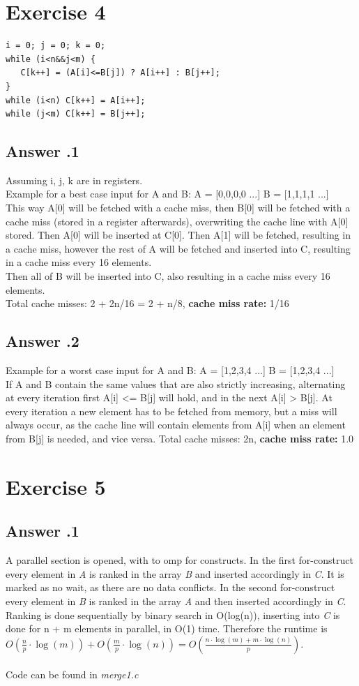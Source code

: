 \documentclass[a4paper,%
11pt,%
DIV=12,
headsepline,%
headings=normal,
]{scrartcl}
\newcounter{curex}
\newcommand{\exercise}[1]{\section*{Exercise #1}\setcounter{curex}{#1}}
\newcommand{\answer}[1]{\subsection*{Answer \arabic{curex}.#1}}
\begin{document}
\exercise{4}

\begin{minipage}[t]{1.0\linewidth}
\begin{lstlisting}
i = 0; j = 0; k = 0; 
while (i<n&&j<m) {
   C[k++] = (A[i]<=B[j]) ? A[i++] : B[j++]; 
}
while (i<n) C[k++] = A[i++]; 
while (j<m) C[k++] = B[j++];
\end{lstlisting}
\end{minipage}

\answer{1}
Assuming i, j, k are in registers. \\
Example for a best case input for A and B:
A = [0,0,0,0 ...] 
B = [1,1,1,1 ...] \\
This way A[0] will be fetched with a cache miss, then B[0] will be fetched with a cache miss (stored in a register afterwards), overwriting the cache line with A[0] stored. Then A[0] will be inserted at C[0].
Then A[1] will be fetched, resulting in a cache miss, however the rest of A will be fetched and inserted into C, resulting in a cache miss every 16 elements. \\
Then all of B will be inserted into C, also resulting in a cache miss every 16 elements. \\
Total cache misses: 2 + 2n/16 = 2 + n/8, \textbf{cache miss rate:} 1/16

\answer{2}
Example for a worst case input for A and B:
A = [1,2,3,4 ...] 
B = [1,2,3,4 ...] \\
If A and B contain the same values that are also strictly increasing, alternating at every iteration first A[i] <= B[j] will hold, and in the next A[i] > B[j]. At every iteration a new element has to be fetched from memory, but a miss will always occur, as the cache line will contain elements from A[i] when an element from B[j] is needed, and vice versa.  
Total cache misses: 2n, \textbf{cache miss rate:} 1.0

\exercise{5}

\answer{1}
A parallel section is opened, with to omp for constructs. In the first for-construct every element in \emph{A} is ranked in the array \emph{B} and inserted accordingly in \emph{C}. It is marked as no wait, as there are no data conflicts. In the second for-construct every element in \emph{B} is ranked in the array \emph{A} and then inserted accordingly in \emph{C}. Ranking is done sequentially by binary search in O(log(n)), inserting into \emph{C} is done for n + m elements in parallel, in O(1) time. Therefore the runtime is $ O\left(\frac{n}{p} \cdot \log(m) \right) + O\left(\frac{m}{p} \cdot \log(n)\right) = 
O\left(\frac{n \cdot \log(m) + m \cdot \log(n)}{p}\right)$.
\\
\\
Code can be found in \textit{merge1.c}
\end{document}
